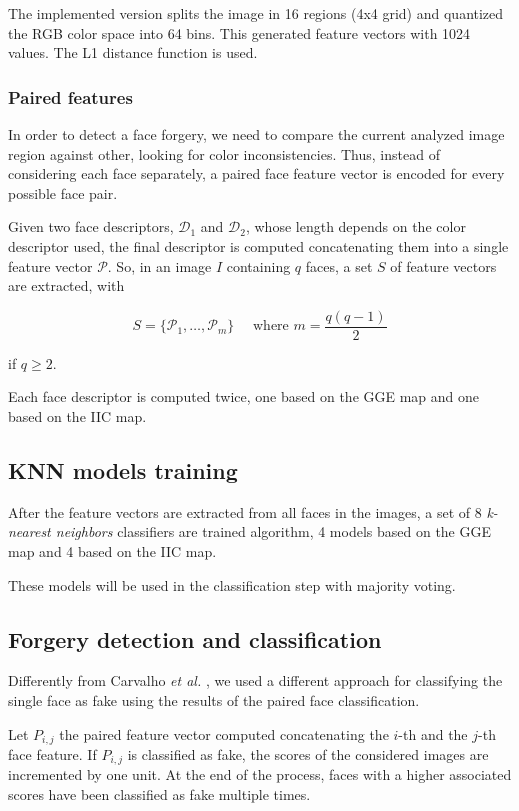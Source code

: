 The implemented version splits the image
in 16 regions (4x4 grid) and quantized the RGB color space into 64 bins. This generated feature vectors with 1024 values. The L1 distance function is used.


\subsubsection{Paired features}

In order to detect a face forgery, we need to compare  the current analyzed image region against other, looking for color inconsistencies. Thus, instead of considering each face separately, a paired face feature vector is encoded for every possible face pair.

Given two face descriptors, $\mathcal{D_1}$ and $\mathcal{D_2}$, whose length depends on the color descriptor used, the final descriptor is computed concatenating them into a single feature vector $\mathcal{P}$. So, in an image $I$ containing $q$ faces, a set $S$ of feature vectors are extracted, with

$$
S = \{\mathcal{P}_1, \ldots, \mathcal{P}_m\} \quad \textrm{  where } m = \frac{q (q-1)}{2}
$$

if $q \geq 2$. 

Each face descriptor is computed twice, one based on the GGE map and one based on the IIC map.

\subsection{KNN models training}

After the feature vectors are extracted from all faces in the images, a set of 8 \emph{k-nearest neighbors} classifiers are trained algorithm, 4 models based on the GGE map and 4 based on the IIC map. 

These models will be used in the classification step with majority voting.

\subsection{Forgery detection and classification}

Differently from Carvalho \emph{et al.} \cite{carvalho2016illuminant}, we used a different approach for classifying the single face as fake using the results of the paired face classification. 

Let $P_{i, j}$ the paired feature vector computed concatenating the $i$-th and the $j$-th face feature. If $P_{i, j}$ is classified as fake, the scores of the considered images are incremented by one unit. At the end of the process, faces with a higher associated scores have been classified as fake multiple times.

